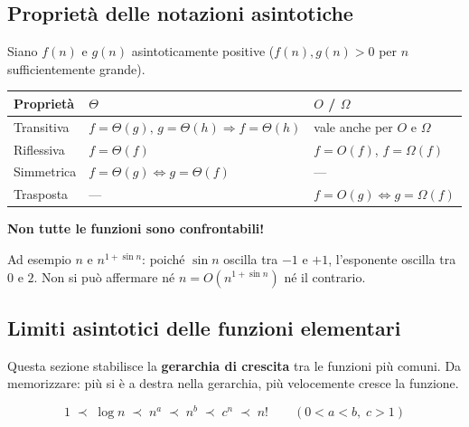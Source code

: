 \subsection{Proprietà delle notazioni asintotiche}

Siano $f(n)$ e $g(n)$ asintoticamente positive ($f(n), g(n) > 0$
per $n$ sufficientemente grande).

\begin{center}
	\renewcommand{\arraystretch}{1.3}
	\begin{tabular}{lll}
		\toprule
		\textbf{Proprietà} & \textbf{$\Theta$} & \textbf{$O$ / $\Omega$} \\
		\midrule
		Transitiva & $f\!=\!\Theta(g),\,g\!=\!\Theta(h) \Rightarrow f\!=\!\Theta(h)$
		& vale anche per $O$ e $\Omega$ \\
		Riflessiva & $f = \Theta(f)$ & $f=O(f)$, $f=\Omega(f)$ \\
		Simmetrica & $f=\Theta(g) \Leftrightarrow g=\Theta(f)$ & — \\
		Trasposta  & — & $f=O(g) \Leftrightarrow g=\Omega(f)$ \\
		\bottomrule
	\end{tabular}
\end{center}

\begin{hardnote}
	\textbf{Non tutte le funzioni sono confrontabili!}
	
	Ad esempio $n$ e $n^{1+\sin n}$: poiché $\sin n$ oscilla tra
	$-1$ e $+1$, l'esponente oscilla tra $0$ e $2$. Non si può
	affermare né $n = O(n^{1+\sin n})$ né il contrario.
\end{hardnote}

\subsection{Limiti asintotici delle funzioni elementari}

\begin{softnote}
	Questa sezione stabilisce la \textbf{gerarchia di crescita} tra
	le funzioni più comuni. Da memorizzare: più si è a destra nella
	gerarchia, più velocemente cresce la funzione.
\end{softnote}

\[
1 \;\prec\; \log n \;\prec\; n^a \;\prec\; n^b
\;\prec\; c^n \;\prec\; n!
\qquad (0 < a < b,\; c > 1)
\]


